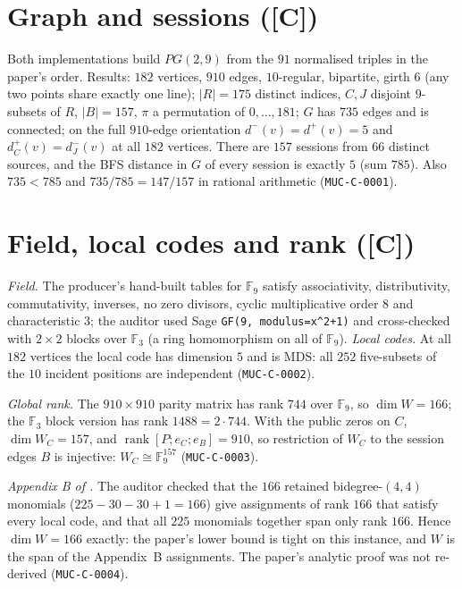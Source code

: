\documentclass[10pt]{article}
\newcommand{\tier}[1]{\textsf{[#1]}}
\newcommand{\tC}{\tier{C}}
\newcommand{\F}{\mathbb F}
\begin{document}
\section{Graph and sessions (\tC{})}\label{sec:graph}
Both implementations build $PG(2,9)$ from the $91$ normalised triples in the paper's order. Results: $182$ vertices, $910$ edges, $10$-regular, bipartite, girth $6$ (any two points share exactly one line); $|R|=175$ distinct indices, $C,J$ disjoint $9$-subsets of $R$, $|B|=157$, $\pi$ a permutation of $0,\dots,181$; $G$ has $735$ edges and is connected; on the full $910$-edge orientation $d^-(v)=d^+(v)=5$ and $d^+_C(v)=d^-_J(v)$ at all $182$ vertices. There are $157$ sessions from $66$ distinct sources, and the BFS distance in $G$ of every session is exactly $5$ (sum $785$). Also $735<785$ and $735/785=147/157$ in rational arithmetic (\texttt{MUC-C-0001}).

\section{Field, local codes and rank (\tC{})}\label{sec:rank}
\emph{Field.} The producer's hand-built tables for $\F_9$ satisfy associativity, distributivity, commutativity, inverses, no zero divisors, cyclic multiplicative order $8$ and characteristic $3$; the auditor used Sage \texttt{GF(9, modulus=x\^{}2+1)} and cross-checked with $2\times2$ blocks over $\F_3$ (a ring homomorphism on all of $\F_9$). \emph{Local codes.} At all $182$ vertices the local code has dimension $5$ and is MDS: all $252$ five-subsets of the $10$ incident positions are independent (\texttt{MUC-C-0002}).

\emph{Global rank.} The $910\times910$ parity matrix has rank $744$ over $\F_9$, so $\dim W=166$; the $\F_3$ block version has rank $1488=2\cdot744$. With the public zeros on $C$, $\dim W_C=157$, and $\operatorname{rank}[P;e_C;e_B]=910$, so restriction of $W_C$ to the session edges $B$ is injective: $W_C\cong\F_9^{157}$ (\texttt{MUC-C-0003}).

\emph{Appendix B of \cite{bh}.} The auditor checked that the $166$ retained bidegree-$(4,4)$ monomials ($225-30-30+1=166$) give assignments of rank $166$ that satisfy every local code, and that all $225$ monomials together span only rank $166$. Hence $\dim W=166$ exactly: the paper's lower bound is tight on this instance, and $W$ is the span of the Appendix~B assignments. The paper's analytic proof was not re-derived (\texttt{MUC-C-0004}).
\end{document}

